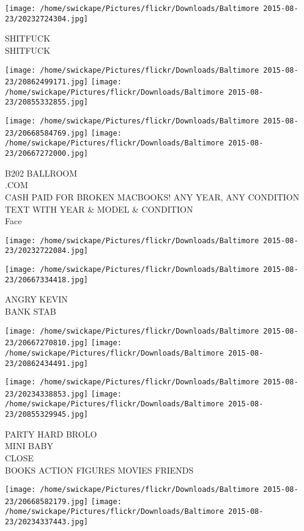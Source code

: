 \documentclass[10pt,letterpaper]{article}
\begin{document}
\vspace{0.25in}
\texttt{[image: /home/swickape/Pictures/flickr/Downloads/Baltimore 2015-08-23/20232724304.jpg]}

SHITFUCK\\
SHITFUCK\\
\pagebreak

\texttt{[image: /home/swickape/Pictures/flickr/Downloads/Baltimore 2015-08-23/20862499171.jpg]}
\texttt{[image: /home/swickape/Pictures/flickr/Downloads/Baltimore 2015-08-23/20855332855.jpg]}

\texttt{[image: /home/swickape/Pictures/flickr/Downloads/Baltimore 2015-08-23/20668584769.jpg]}
\texttt{[image: /home/swickape/Pictures/flickr/Downloads/Baltimore 2015-08-23/20667272000.jpg]}

B202 BALLROOM\\
.COM\\
CASH PAID FOR BROKEN MACBOOKS!  ANY YEAR, ANY CONDITION TEXT WITH YEAR \& MODEL \& CONDITION\\
Face\\
\pagebreak

\texttt{[image: /home/swickape/Pictures/flickr/Downloads/Baltimore 2015-08-23/20232722084.jpg]}

\vspace{0.25in}
\texttt{[image: /home/swickape/Pictures/flickr/Downloads/Baltimore 2015-08-23/20667334418.jpg]}

ANGRY KEVIN\\
BANK STAB\\
\pagebreak

\texttt{[image: /home/swickape/Pictures/flickr/Downloads/Baltimore 2015-08-23/20667270810.jpg]}
\texttt{[image: /home/swickape/Pictures/flickr/Downloads/Baltimore 2015-08-23/20862434491.jpg]}

\texttt{[image: /home/swickape/Pictures/flickr/Downloads/Baltimore 2015-08-23/20234338853.jpg]}
\texttt{[image: /home/swickape/Pictures/flickr/Downloads/Baltimore 2015-08-23/20855329945.jpg]}

PARTY HARD BROLO\\
MINI BABY\\
CLOSE\\
BOOKS ACTION FIGURES MOVIES FRIENDS\\
\pagebreak

\texttt{[image: /home/swickape/Pictures/flickr/Downloads/Baltimore 2015-08-23/20668582179.jpg]}
\texttt{[image: /home/swickape/Pictures/flickr/Downloads/Baltimore 2015-08-23/20234337443.jpg]}
\end{document}
